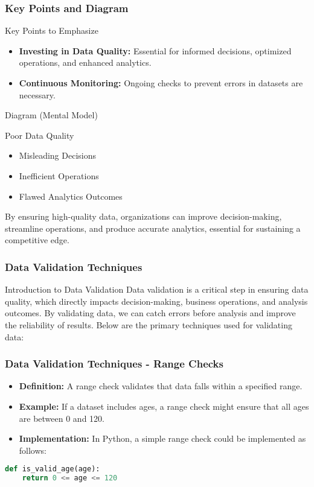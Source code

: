 \documentclass[aspectratio=169]{beamer}
\begin{document}
\begin{frame}[fragile]
    \frametitle{Key Points and Diagram}
    \begin{block}{Key Points to Emphasize}
        \begin{itemize}
            \item \textbf{Investing in Data Quality:} Essential for informed decisions, optimized operations, and enhanced analytics.
            \item \textbf{Continuous Monitoring:} Ongoing checks to prevent errors in datasets are necessary.
        \end{itemize}
    \end{block}

    \begin{block}{Diagram (Mental Model)}
        \begin{center}
            Poor Data Quality 
            \begin{itemize}
                \item Misleading Decisions
                \item Inefficient Operations
                \item Flawed Analytics Outcomes
            \end{itemize}
        \end{center}
    \end{block}

    By ensuring high-quality data, organizations can improve decision-making, streamline operations, and produce accurate analytics, essential for sustaining a competitive edge.
\end{frame}

\begin{frame}
    \frametitle{Data Validation Techniques}
    \begin{block}{Introduction to Data Validation}
        Data validation is a critical step in ensuring data quality, which directly impacts decision-making, business operations, and analysis outcomes. By validating data, we can catch errors before analysis and improve the reliability of results. Below are the primary techniques used for validating data:
    \end{block}
\end{frame}

\begin{frame}[fragile]
    \frametitle{Data Validation Techniques - Range Checks}
    \begin{itemize}
        \item \textbf{Definition:} A range check validates that data falls within a specified range.
        \item \textbf{Example:} If a dataset includes ages, a range check might ensure that all ages are between 0 and 120.
        \item \textbf{Implementation:} In Python, a simple range check could be implemented as follows:
    \end{itemize}
    
    \begin{lstlisting}[language=Python]
def is_valid_age(age):
    return 0 <= age <= 120
    \end{lstlisting}
\end{frame}
\end{document}
